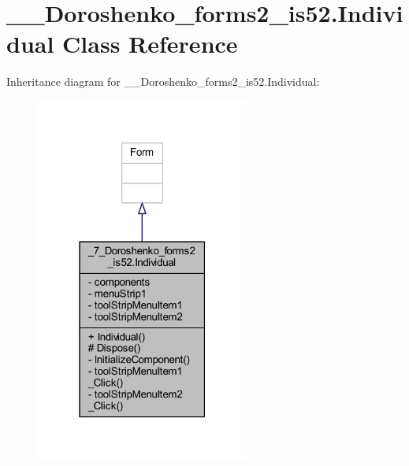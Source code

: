 \hypertarget{class__7___doroshenko__forms2__is52_1_1_individual}{}\section{\+\_\+\_\+\+Doroshenko\+\_\+forms2\+\_\+is52.\+Individual Class Reference}
\label{class__7___doroshenko__forms2__is52_1_1_individual}


Inheritance diagram for \+\_\+\_\+\+Doroshenko\+\_\+forms2\+\_\+is52.\+Individual\+:
\nopagebreak
\begin{figure}[H]
\begin{center}
\leavevmode
\includegraphics[width=199pt]{class__7___doroshenko__forms2__is52_1_1_individual__inherit__graph}
\end{center}
\end{figure}


